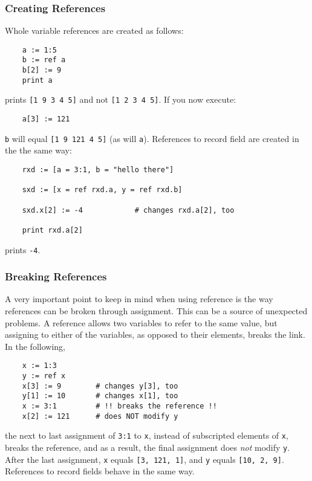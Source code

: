 \subsubsection{Creating References}
Whole variable references are created as follows:
\begin{verbatim}
    a := 1:5
    b := ref a
    b[2] := 9
    print a
\end{verbatim}
prints {\tt [1 9 3 4 5]} and not {\tt [1 2 3 4 5]}.  If you now execute:
\begin{verbatim}
    a[3] := 121
\end{verbatim}
{\tt b} will equal {\tt [1 9 121 4 5]} (as will {\tt a}). References
to record field are created in the the same way:
\begin{verbatim}
    rxd := [a = 3:1, b = "hello there"]

    sxd := [x = ref rxd.a, y = ref rxd.b]

    sxd.x[2] := -4            # changes rxd.a[2], too

    print rxd.a[2]
\end{verbatim}
prints {\tt -4}. 

\subsubsection{Breaking References}

A very important point
to keep in mind when using reference is the way references
can be broken through assignment. This can be a source of unexpected problems. A reference
allows two variables to refer to the same value, but assigning to either of the 
variables, as opposed to their elements, breaks the link. 
In the following,
\begin{verbatim}
    x := 1:3
    y := ref x
    x[3] := 9        # changes y[3], too
    y[1] := 10       # changes x[1], too
    x := 3:1         # !! breaks the reference !!
    x[2] := 121      # does NOT modify y
\end{verbatim}
the next to last assignment of {\tt 3:1} to {\tt x}, instead of subscripted elements
of {\tt x}, breaks the reference, and as a result, the final assignment does {\em not}
modify {\tt y}. After the last assignment, {\tt x} equals {\tt [3, 121, 1]}, and {\tt y}
equals {\tt [10, 2, 9]}. References to record fields behave in the same way.

